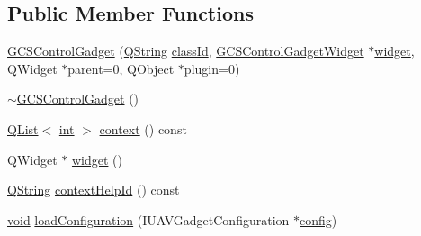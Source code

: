 \subsection*{Public Member Functions}
\begin{DoxyCompactItemize}
\item 
\hyperlink{group___g_c_s_control_gadget_plugin_gaa2bb4808899771140d27bd47b54ccb8c}{G\-C\-S\-Control\-Gadget} (\hyperlink{group___u_a_v_objects_plugin_gab9d252f49c333c94a72f97ce3105a32d}{Q\-String} \hyperlink{group___core_plugin_ga3878fde66a57220608960bcc3fbeef2c}{class\-Id}, \hyperlink{class_g_c_s_control_gadget_widget}{G\-C\-S\-Control\-Gadget\-Widget} $\ast$\hyperlink{group___g_c_s_control_gadget_plugin_ga36c99e15ded265f21ddeb3b0ef9a344f}{widget}, Q\-Widget $\ast$parent=0, Q\-Object $\ast$plugin=0)
\item 
\hyperlink{group___g_c_s_control_gadget_plugin_ga109d324fea74699d89e95ea779cd7c18}{$\sim$\-G\-C\-S\-Control\-Gadget} ()
\item 
\hyperlink{class_q_list}{Q\-List}$<$ \hyperlink{ioapi_8h_a787fa3cf048117ba7123753c1e74fcd6}{int} $>$ \hyperlink{group___g_c_s_control_gadget_plugin_gaebdfdbcaa43f61addf35752163d359d7}{context} () const 
\item 
Q\-Widget $\ast$ \hyperlink{group___g_c_s_control_gadget_plugin_ga36c99e15ded265f21ddeb3b0ef9a344f}{widget} ()
\item 
\hyperlink{group___u_a_v_objects_plugin_gab9d252f49c333c94a72f97ce3105a32d}{Q\-String} \hyperlink{group___g_c_s_control_gadget_plugin_ga5be6c84c2994367f7f86e3553cf68b19}{context\-Help\-Id} () const 
\item 
\hyperlink{group___u_a_v_objects_plugin_ga444cf2ff3f0ecbe028adce838d373f5c}{void} \hyperlink{group___g_c_s_control_gadget_plugin_ga439722d2b4016bbfaad9486b20c35a1a}{load\-Configuration} (I\-U\-A\-V\-Gadget\-Configuration $\ast$\hyperlink{deflate_8c_a4473b5227787415097004fd39f55185e}{config})
\end{DoxyCompactItemize}
